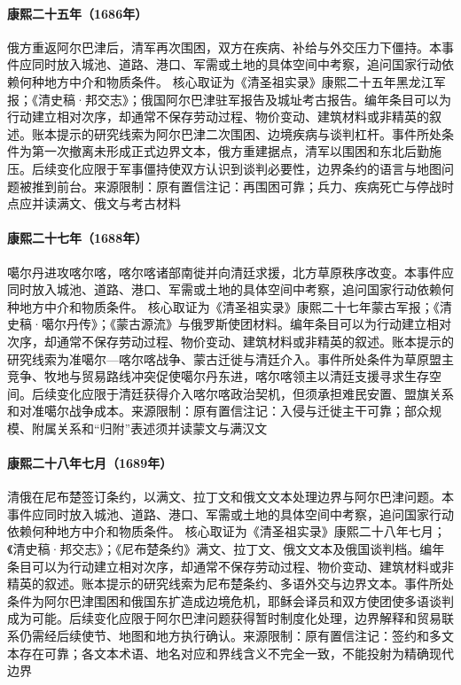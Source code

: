 \hypertarget{civic:EQ-1686-ALBAZIN-SECOND}{}\paragraph{康熙二十五年（1686年）}俄方重返阿尔巴津后，清军再次围困，双方在疾病、补给与外交压力下僵持。本事件应同时放入城池、道路、港口、军需或土地的具体空间中考察，追问国家行动依赖何种地方中介和物质条件。 核心取证为《清圣祖实录》康熙二十五年黑龙江军报；《清史稿·邦交志》；俄国阿尔巴津驻军报告及城址考古报告。编年条目可以为行动建立相对次序，却通常不保存劳动过程、物价变动、建筑材料或非精英的叙述。账本提示的研究线索为阿尔巴津二次围困、边境疾病与谈判杠杆。事件所处条件为第一次撤离未形成正式边界文本，俄方重建据点，清军以围困和东北后勤施压。后续变化应限于军事僵持使双方认识到谈判必要性，边界条约的语言与地图问题被推到前台。来源限制：原有置信注记：再围困可靠；兵力、疾病死亡与停战时点应并读满文、俄文与考古材料
\hypertarget{civic:EQ-1688-GALDAN-KHALKHA}{}\paragraph{康熙二十七年（1688年）}噶尔丹进攻喀尔喀，喀尔喀诸部南徙并向清廷求援，北方草原秩序改变。本事件应同时放入城池、道路、港口、军需或土地的具体空间中考察，追问国家行动依赖何种地方中介和物质条件。 核心取证为《清圣祖实录》康熙二十七年蒙古军报；《清史稿·噶尔丹传》；《蒙古源流》与俄罗斯使团材料。编年条目可以为行动建立相对次序，却通常不保存劳动过程、物价变动、建筑材料或非精英的叙述。账本提示的研究线索为准噶尔—喀尔喀战争、蒙古迁徙与清廷介入。事件所处条件为草原盟主竞争、牧地与贸易路线冲突促使噶尔丹东进，喀尔喀领主以清廷支援寻求生存空间。后续变化应限于清廷获得介入喀尔喀政治契机，但须承担难民安置、盟旗关系和对准噶尔战争成本。来源限制：原有置信注记：入侵与迁徙主干可靠；部众规模、附属关系和“归附”表述须并读蒙文与满汉文
\hypertarget{civic:EQ-1689-NERCHINSK}{}\paragraph{康熙二十八年七月（1689年）}清俄在尼布楚签订条约，以满文、拉丁文和俄文文本处理边界与阿尔巴津问题。本事件应同时放入城池、道路、港口、军需或土地的具体空间中考察，追问国家行动依赖何种地方中介和物质条件。 核心取证为《清圣祖实录》康熙二十八年七月；《清史稿·邦交志》；《尼布楚条约》满文、拉丁文、俄文文本及俄国谈判档。编年条目可以为行动建立相对次序，却通常不保存劳动过程、物价变动、建筑材料或非精英的叙述。账本提示的研究线索为尼布楚条约、多语外交与边界文本。事件所处条件为阿尔巴津围困和俄国东扩造成边境危机，耶稣会译员和双方使团使多语谈判成为可能。后续变化应限于阿尔巴津问题获得暂时制度化处理，边界解释和贸易联系仍需经后续使节、地图和地方执行确认。来源限制：原有置信注记：签约和多文本存在可靠；各文本术语、地名对应和界线含义不完全一致，不能投射为精确现代边界
